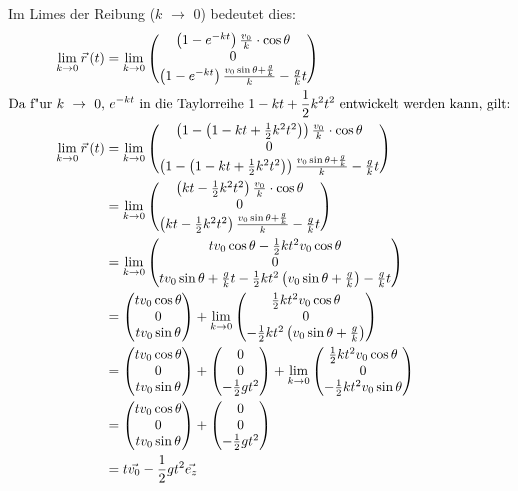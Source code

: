 \documentclass{theozettel}
\begin{document}
Im Limes der Reibung ($k$ $\rightarrow$ 0) bedeutet dies:
\begin{align*}
\lim_{k\rightarrow 0}\vec{r}\left(t\right)&=\lim_{k\rightarrow 0}\mqty(\left(1-e^{-kt}\right)\frac{v_0}{k}\cdot \cos\theta\\0\\\left(1-e^{-kt}\right)\frac{v_0\sin\theta +\frac{g}{k}}{k}-\frac{g}{k}t)\\
\text{Da f"ur} \ k \ \rightarrow \ 0\text{,} &\  e^{-kt} \ \text{in die Taylorreihe} \ 1-kt+\frac{1}{2}k^2t^2 \ \text{entwickelt werden kann, gilt:} \\
\lim_{k\rightarrow 0}\vec{r}\left(t\right)&=\lim_{k\rightarrow 0}\mqty(\left(1-\left(1-kt+\frac{1}{2}k^2t^2\right)\right)\frac{v_0}{k}\cdot \cos\theta\\0\\\left(1-\left(1-kt+\frac{1}{2}k^2t^2\right)\right)\frac{v_0\sin\theta +\frac{g}{k}}{k}-\frac{g}{k}t)\\
&=\lim_{k\rightarrow 0}\mqty(\left(kt-\frac{1}{2}k^2t^2\right)\frac{v_0}{k}\cdot\cos\theta\\0\\\left(kt-\frac{1}{2}k^2t^2\right)\frac{v_0\sin\theta+\frac{g}{k}}{k}-\frac{g}{k}t)\\
&=\lim_{k\rightarrow 0}\mqty(tv_0\cos\theta-\frac{1}{2}kt^2 v_0\cos\theta\\0\\ tv_0 \sin\theta +\frac{g}{k}t-\frac{1}{2}kt^2\left(v_0\sin\theta+\frac{g}{k}\right)-\frac{g}{k}t)\\
&=\mqty(tv_0\cos\theta\\0\\tv_0 \sin\theta)+\lim_{k\rightarrow 0}\mqty(\frac{1}{2}kt^2 v_0\cos\theta\\0\\-\frac{1}{2}kt^2\left(v_0\sin\theta+\frac{g}{k}\right))\\
&=\mqty(tv_0\cos\theta\\0\\tv_0 \sin\theta)+\mqty(0\\0\\-\frac{1}{2}gt^2)+\lim_{k\rightarrow 0}\mqty(\frac{1}{2}kt^2 v_0\cos\theta\\0\\-\frac{1}{2}kt^2v_0\sin\theta)\\
&=\mqty(tv_0\cos\theta\\0\\tv_0 \sin\theta)+\mqty(0\\0\\-\frac{1}{2}gt^2)\\
&=t\vec{v_0}-\frac{1}{2}gt^2\vec{e_z}
\end{align*}
\newpage
\end{document}
